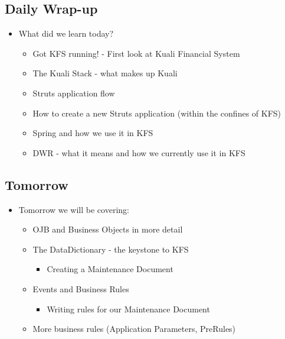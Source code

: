 \documentclass[12pt,notitlepage]{article}
\begin{document}

\begin{ifhtml}
    \begin{s5slide}
        \section{Daily Wrap-up}
            \begin{itemize}
                \item What did we learn today?
                \begin{itemize}
                    \item Got KFS running! - First look at Kuali Financial System
                    \item The Kuali Stack - what makes up Kuali
                    \item Struts application flow
                    \item How to create a new Struts application (within the confines of KFS)
                    \item Spring and how we use it in KFS
                    \item DWR - what it means and how we currently use it in KFS
                \end{itemize}
            \end{itemize}
    \end{s5slide}
    \begin{s5slide}
        \section{Tomorrow}
            \begin{itemize}
                \item Tomorrow we will be covering:
                \begin{itemize}
                    \item OJB and Business Objects in more detail
                    \item The DataDictionary - the keystone to KFS 
                    \begin{itemize}
                        \item Creating a Maintenance Document
                    \end{itemize}
                    \item Events and Business Rules
                    \begin{itemize}
                        \item Writing rules for our Maintenance Document
                    \end{itemize}
                    \item More business rules (Application Parameters, PreRules)
                \end{itemize}
            \end{itemize}
    \end{s5slide}
    \begin{s5slide}

\end{s5slide}
\end{ifhtml}
\end{document}
